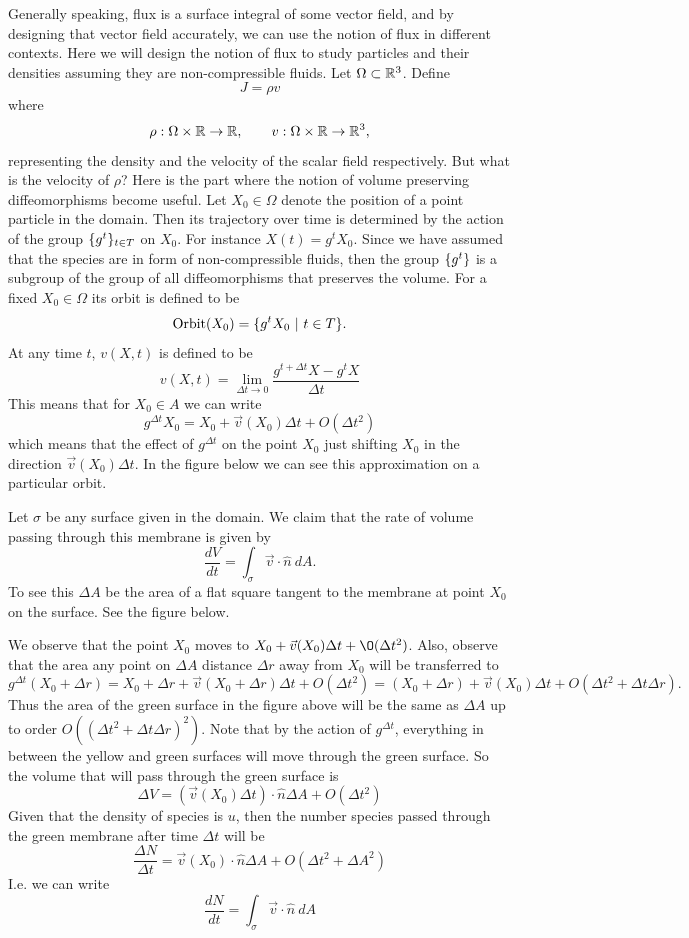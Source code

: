 Generally speaking, flux is a surface integral of some vector field, and by designing that vector field accurately, we can use the notion of flux in different contexts. Here we will design the notion of flux to study particles and their densities assuming they are non-compressible fluids. Let $ \Omega \subset \mathbb{R}^3 $. Define 
\[ J = \rho v \]
where
\[ \rho: \Omega\times \mathbb{R} \to \mathbb{R}, \qquad v:\Omega\times \mathbb{R}\to\mathbb{R}^3, \]
representing the density and the velocity of the scalar field respectively. But what is the velocity of $ \rho $? Here is the part where the notion of volume preserving diffeomorphisms become useful. Let $ X_0 \in\Omega $ denote the position of a point particle in the domain. Then its trajectory over time is determined by the action of the group $ \{g^t\}_{t \in T} $ on $ X_0 $. For instance $ X(t) = g^t X_0 $. Since we have assumed that the species are in form of non-compressible fluids, then the group $ \{g^t\} $ is a subgroup of the group of all diffeomorphisms that preserves the volume. For a fixed $ X_0 \in \Omega $ its orbit is defined to be
\[ \operatorname{Orbit}(X_0) = \{g^t X_0 \ |\ t \in T\}. \]
At any time $ t $, $ v(X,t) $ is defined to be
\[ v(X,t) = \lim_{\Delta t \to 0} \frac{g^{t+\Delta t} X - g^{t} X}{\Delta t} \]
This means that for $ X_0 \in A $ we can write
\[ g^{\Delta t} X_0 = X_0 + \vec{v}(X_0) \Delta t + O(\Delta t ^2) \]
which means that the effect of $ g^{\Delta t} $ on the point $ X_0 $ just shifting $ X_0 $ in the direction $ \vec{v}(X_0) \Delta t  $. In the figure below we can see this approximation on a particular orbit.

Let $ \sigma $ be any surface given in the domain. We claim that the rate of volume passing through this membrane is given by
\[ \frac{dV}{dt} = \int_\sigma \vec{v}\cdot \hat{n}\ dA. \]
To see this $ \Delta A $ be the area of a flat square tangent to the membrane at point $ X_0 $ on the surface. See the figure below.


\noindent We observe that the point $ X_0 $ moves to $ X_0 + \vec{v}(X_0)\Delta t + \O(\Delta t^2) $. Also, observe that the area any point on $ \Delta A $ distance $ \Delta r $ away from $ X_0 $ will be transferred to 
\[ g^{\Delta t} (X_0 + \Delta r) = X_0 + \Delta r + \vec{v}(X_0 + \Delta r)\Delta t + O(\Delta t^2) = (X_0 + \Delta r) + \vec{v}(X_0) \Delta t + O(\Delta t^2 + \Delta t \Delta r).  \]
Thus the area of the green surface in the figure above will be the same as $ \Delta A $ up to order
$ O((\Delta t^2 + \Delta t \Delta r)^2) $. Note that by the action of $ g^{\Delta t} $, everything in between the yellow and green surfaces will move through the green surface. So the volume that will pass through the green surface is
\[ \Delta V = (\vec{v}(X_0)\Delta t)\cdot \hat{n} \Delta A + O(\Delta t^2) \]
Given that the density of species is $ u $, then the number species passed through the green membrane after time $ \Delta t $ will be
\[ \frac{\Delta N}{\Delta t} = \vec{v}(X_0)\cdot \hat{n}\Delta A + O(\Delta t^2 + \Delta A^2) \]
I.e. we can write
\[ \frac{d N }{dt} = \int_\sigma \vec{v}\cdot \hat{n}\ dA \]


